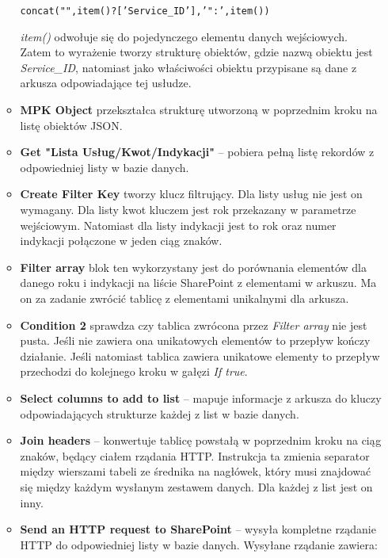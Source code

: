 \begin{enumerate}
\begin{itemize}[label=\textasteriskcentered]
        \begin{center}
        \texttt{concat("",item()?['Service\_ID'],'":',item())}
        \end{center}
        
        \emph{item()} odwołuje się do pojedynczego elementu danych wejściowych. Zatem to wyrażenie tworzy strukturę obiektów, gdzie nazwą obiektu jest \emph{Service\_ID}, natomiast jako właściwości obiektu przypisane są dane z arkusza odpowiadające tej usłudze.
        \item \textbf{MPK Object} przekształca strukturę utworzoną w poprzednim kroku na listę obiektów JSON.
    \end{itemize}

    \begin{itemize}
    \item\textbf{Get "Lista Usług/Kwot/Indykacji"} -- pobiera pełną listę rekordów z odpowiedniej listy w bazie danych.
    \item \textbf{Create Filter Key} tworzy klucz filtrujący. Dla listy usług nie jest on wymagany. Dla listy kwot kluczem jest rok przekazany w parametrze wejściowym. Natomiast dla listy indykacji jest to rok oraz numer indykacji połączone w jeden ciąg znaków.
    \item \textbf{Filter array} blok ten wykorzystany jest do porównania elementów dla danego roku i indykacji na liście SharePoint z elementami w arkuszu. Ma on za zadanie zwrócić tablicę z elementami unikalnymi dla arkusza.
    \item \textbf{Condition 2} sprawdza czy tablica zwrócona przez \emph{Filter array} nie jest pusta. Jeśli nie zawiera ona unikatowych elementów to przepływ kończy działanie.
    Jeśli natomiast tablica zawiera unikatowe elementy to przepływ przechodzi do kolejnego kroku w gałęzi \emph{If true}.
    \item \textbf{Select columns to add to list} -- mapuje informacje z arkusza do kluczy odpowiadających strukturze każdej z list w bazie danych.
    \item \textbf{Join headers} -- konwertuje tablicę powstałą w poprzednim kroku na ciąg znaków, będący ciałem rządania HTTP. Instrukcja ta zmienia separator między wierszami tabeli ze średnika na nagłówek, który musi znajdować się między każdym wysłanym zestawem danych. Dla każdej z list jest on inny.
    \item \textbf{Send an HTTP request to SharePoint} -- wysyła kompletne rządanie HTTP do odpowiedniej listy w bazie danych. Wysyłane rządanie zawiera:
    \begin{itemize}

\end{itemize}
\end{itemize}
\end{enumerate}
